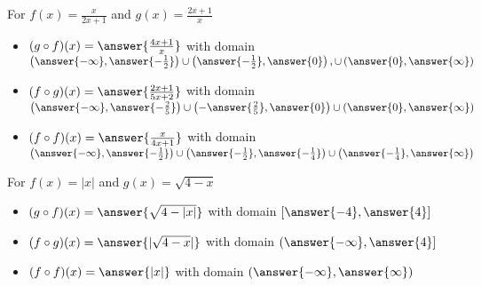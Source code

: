 \documentclass{ximera}
\begin{document}
\begin{exercise}
For    $f(x) = \frac{x}{2x+1}$ and $g(x) = \frac{2x+1}{x}$
\begin{itemize}
\item  $(g \circ f)(x)=\answer{\frac{4x+1}{x}}$ with domain $\left(\answer{-\infty}, \answer{-\frac{1}{2}}\right) \cup \left(\answer{-\frac{1}{2}}, \answer{0}\right), \cup \left(\answer{0}, \answer{\infty}\right)$
\item  $(f \circ g)(x)=\answer{\frac{2x+1}{5x+2}}$ with domain $\left(\answer{-\infty}, \answer{-\frac{2}{5}}\right) \cup \left(-\answer{\frac{2}{5}},\answer{0}\right) \cup \left(\answer{0},\answer{\infty}\right)$
\item  $(f \circ f)(x)=\answer{\frac{x}{4x+1}}$ with domain $\left(\answer{-\infty}, \answer{-\frac{1}{2}}\right) \cup \left(\answer{-\frac{1}{2}}, \answer{-\frac{1}{4}} \right) \cup \left(\answer{-\frac{1}{4}},\answer{\infty}\right)$
\end{itemize}
\end{exercise}


\begin{exercise}
For   $f(x) = |x|$ and $g(x) = \sqrt{4-x}$
\begin{itemize}
\item  $(g \circ f)(x)=\answer{\sqrt{4-|x|}}$ with domain $\left[\answer{-4},\answer{4}\right]$
\item  $(f \circ g)(x)=\answer{|\sqrt{4-x}|}$ with domain $\left(\answer{-\infty},\answer{4}\right]$
\item  $(f \circ f)(x)=\answer{|x|}$ with domain $\left(\answer{-\infty},\answer{\infty}\right)$
\end{itemize}
\end{exercise}
\end{document}
